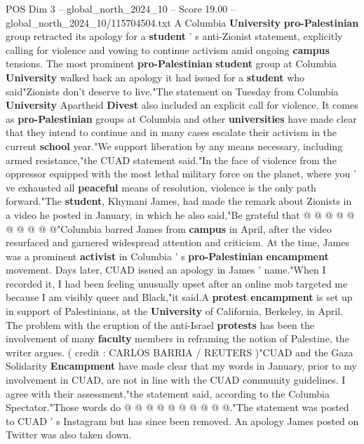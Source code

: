 \begin{textsample}{POS Dim 3 – global\_north\_2024\_10 – Score 19.00 – global\_north\_2024\_10/115704504.txt}  \label{ex:f3_pos_127}
A Columbia \textbf{University} \textbf{pro-Palestinian} group retracted its apology for a \textbf{student} ' s anti-Zionist statement, explicitly calling for violence and vowing to continue activism amid ongoing \textbf{campus} tensions.
The most prominent \textbf{pro-Palestinian} \textbf{student} group at Columbia \textbf{University} walked back an apology it had issued for a \textbf{student} who said"Zionists don't deserve to live."The statement on Tuesday from Columbia \textbf{University} Apartheid \textbf{Divest} also included an explicit call for violence.
It comes as \textbf{pro-Palestinian} groups at Columbia and other \textbf{universities} have made clear that they intend to continue and in many cases escalate their activism in the current \textbf{school} year."We support liberation by any means necessary, including armed resistance,"the CUAD statement said."In the face of violence from the oppressor equipped with the most lethal military force on the planet, where you ' ve exhausted all \textbf{peaceful} means of resolution, violence is the only path forward."The \textbf{student}, Khymani James, had made the remark about Zionists in a video he posted in January, in which he also said,"Be grateful that @ @ @ @ @ @ @ @ @ @"Columbia barred James from \textbf{campus} in April, after the video resurfaced and garnered widespread attention and criticism.
At the time, James was a prominent \textbf{activist} in Columbia ' s \textbf{pro-Palestinian} \textbf{encampment} movement.
Days later, CUAD issued an apology in James ' name."When I recorded it, I had been feeling unusually upset after an online mob targeted me because I am visibly queer and Black,"it said.A \textbf{protest} \textbf{encampment} is set up in support of Palestinians, at the \textbf{University} of California, Berkeley, in April.
The problem with the eruption of the anti-Israel \textbf{protests} has been the involvement of many \textbf{faculty} members in reframing the notion of Palestine, the writer argues. ( credit : CARLOS BARRIA / REUTERS )"CUAD and the Gaza Solidarity \textbf{Encampment} have made clear that my words in January, prior to my involvement in CUAD, are not in line with the CUAD community guidelines.
I agree with their assessment,"the statement said, according to the Columbia Spectator."Those words do @ @ @ @ @ @ @ @ @ @."The statement was posted to CUAD ' s Instagram but has since been removed.
An apology James posted on Twitter was also taken down.

\end{textsample}

